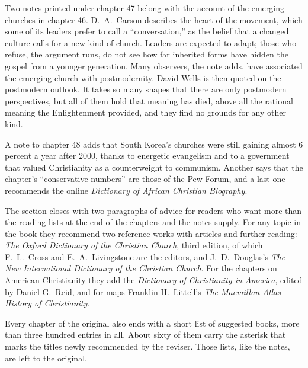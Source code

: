 Two notes printed under chapter 47 belong with the account of the emerging churches in chapter 46.
D.~A.~Carson describes the heart of the movement, which some of its leaders prefer to call a
``conversation,'' as the belief that a changed culture calls for a new kind of church. Leaders are expected to adapt; those who refuse, the argument runs, do not see how far inherited forms have hidden the gospel from a younger generation.
Many observers, the note adds, have associated the emerging church with postmodernity. David Wells
is then quoted on the postmodern outlook. It takes so many shapes that there are only postmodern
perspectives, but all of them hold that meaning has died, above all the rational meaning the
Enlightenment provided, and they find no grounds for any other kind.

A note to chapter 48 adds that South Korea's churches were still gaining almost 6 percent a year after 2000, thanks to energetic evangelism and to a government that valued Christianity as a counterweight to communism. Another says that the chapter's ``conservative numbers'' are those of the Pew
Forum, and a last one recommends the online \emph{Dictionary of African Christian Biography}.

The section closes with two paragraphs of advice for readers who want more than the reading lists at
the end of the chapters and the notes supply. For any topic in the book they recommend two reference
works with articles and further reading: \emph{The Oxford Dictionary of the Christian Church}, third
edition, of which F.~L.~Cross and E.~A.~Livingstone are the editors, and J.~D.~Douglas's \emph{The New International Dictionary of the Christian Church}. For the chapters on American
Christianity they add the \emph{Dictionary of Christianity in America}, edited by Daniel G.~Reid, and
for maps Franklin H.~Littell's \emph{The Macmillan Atlas History of Christianity}.

Every chapter of the original also ends with a short list of suggested books, more than three hundred
entries in all. About sixty of them carry the asterisk that marks the titles newly recommended by the
reviser. Those lists, like the notes, are left to the original.
